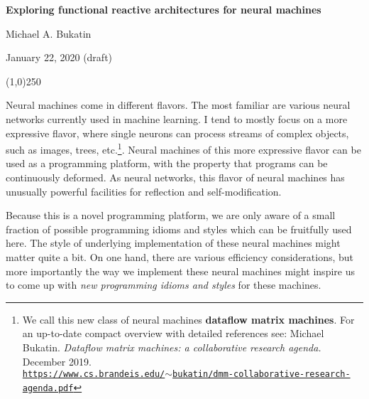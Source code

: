 \documentclass{article}
\begin{document}
\renewcommand{\abstractname}{\vspace{-\baselineskip}}

\renewcommand\contentsname{\vspace{-\baselineskip}}


\begin{center}

{\bf Exploring functional reactive architectures for neural machines}
                                   



\vspace{0.1in}
Michael A. Bukatin


\vspace{0.085in}
January 22, 2020 (draft)

\end{center}



\begin{abstract}

Is it fruitful to consider functional reactive implementations of neural machines?
This draft starts to explore this question.
\end{abstract}

\begin{center}
\line(1,0){250}
\end{center}

Neural machines come in different flavors. The most familiar are various neural networks currently used in machine learning.
I tend to mostly focus on a more expressive flavor, where single neurons can process streams of complex objects, such as images,
trees, etc.\footnote{We call this new class of neural machines {\bf dataflow matrix machines}. For an up-to-date compact overview
with detailed references see: Michael Bukatin.
{\em Dataflow matrix machines: a collaborative research agenda.} December 2019.\\
\href{https://www.cs.brandeis.edu/~bukatin/dmm-collaborative-research-agenda.pdf}{\tt https://www.cs.brandeis.edu/$\sim$bukatin/dmm-collaborative-research-agenda.pdf}}.
Neural machines of this more expressive flavor
can be used as a programming platform, with the property that programs can be continuously deformed.
As neural networks, this flavor of neural machines has unusually powerful facilities for reflection and self-modification.

Because this is a novel programming platform, we are only aware of a small fraction of possible programming idioms and styles
which can be fruitfully used here. The style of underlying implementation of these neural machines might matter quite a bit.
On one hand, there are various efficiency considerations, but more importantly the way we implement these neural machines
might inspire us to come up with {\em new programming idioms and styles} for these machines.
\end{document}
